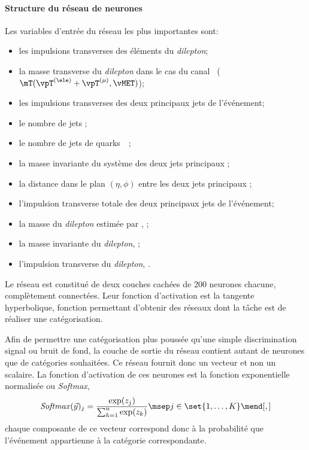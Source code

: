 \paragraph{Structure du réseau de neurones}
Les variables d'entrée du réseau les plus importantes sont:
\begin{itemize}
\item les impulsions transverses des éléments du \emph{dilepton};
\item la masse transverse du \emph{dilepton} dans le cas du canal \ele\mu\ ($\mT(\vpT^{(\ele)}+\vpT^{(\mu)},\vMET)$);
\item les impulsions transverses des deux principaux jets de l'événement;
\item le nombre de jets \Njets;
\item le nombre de jets de quarks~\quarkb\ \Nbjets;
\item la masse invariante du système des deux jets principaux \mjj;
\item la distance dans le plan $(\eta,\phi)$ entre les deux jets principaux \Detajj;
\item l'impulsion transverse totale des deux principaux jets de l'événement;
\item la masse du \emph{dilepton} estimée par \SVFIT, \msv;
\item la masse invariante du \emph{dilepton}, \mvis;
\item l'impulsion transverse du \emph{dilepton}, \pTvis.
\end{itemize}
Le réseau est constitué de deux couches cachées de 200 neurones chacune, complètement connectées.
Leur fonction d'activation est la tangente hyperbolique, fonction permettant d'obtenir des réseaux dont la tâche est de réaliser une catégorisation.
\par
Afin de permettre une catégorisation plus poussée qu'une simple discrimination signal ou bruit de fond, la couche de sortie du réseau contient autant de neurones que de catégories souhaitées.
Ce réseau fournit donc un vecteur et non un scalaire.
La fonction d'activation de ces neurones est la fonction exponentielle normalisée ou \emph{Softmax},
\begin{equation}
\mathit{Softmax}(\vec{y})_j = \frac{\exp(z_j)}{\sum_{k=1}^n \exp(z_k)}
\msep
j\in\set{1,\ldots,K}
\mend[,]
\end{equation}
chaque composante de ce vecteur correspond donc à la probabilité que l'événement appartienne à la catégorie correspondante.
